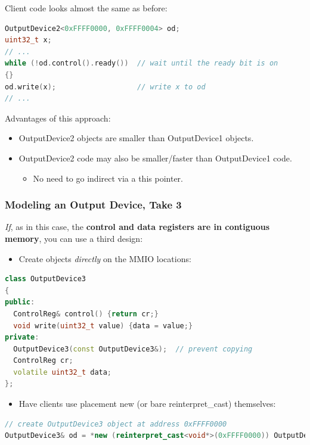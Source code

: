 Client code looks almost the same as before:
\begin{lstlisting}[language=C++]
OutputDevice2<0xFFFF0000, 0xFFFF0004> od;
uint32_t x;
// ...
while (!od.control().ready())  // wait until the ready bit is on
{}
od.write(x);                   // write x to od
// ...
\end{lstlisting}
Advantages of this approach:
\begin{itemize}
  \item OutputDevice2 objects are smaller than OutputDevice1 objects.
  \item OutputDevice2 code may also be smaller/faster than OutputDevice1 code.
  \begin{itemize}
    \item No need to go indirect via a this pointer.
  \end{itemize}
\end{itemize}

\subsubsection{Modeling an Output Device, Take 3}
\textit{If}, as in this case, the \textbf{control and data registers are in contiguous memory}, you can use a third design:
\begin{itemize}
  \item Create objects \textit{directly} on the MMIO locations:
\end{itemize}
\begin{lstlisting}[language=C++]
class OutputDevice3
{
public:
  ControlReg& control() {return cr;}
  void write(uint32_t value) {data = value;}
private:
  OutputDevice3(const OutputDevice3&);  // prevent copying
  ControlReg cr;
  volatile uint32_t data;
};
\end{lstlisting}
\begin{itemize}
  \item Have clients use placement new (or bare reinterpret\_cast) themselves:
\end{itemize}
\begin{lstlisting}[language=C++]
// create OutputDevice3 object at address 0xFFFF0000
OutputDevice3& od = *new (reinterpret_cast<void*>(0xFFFF0000)) OutputDevice3;
\end{lstlisting}

